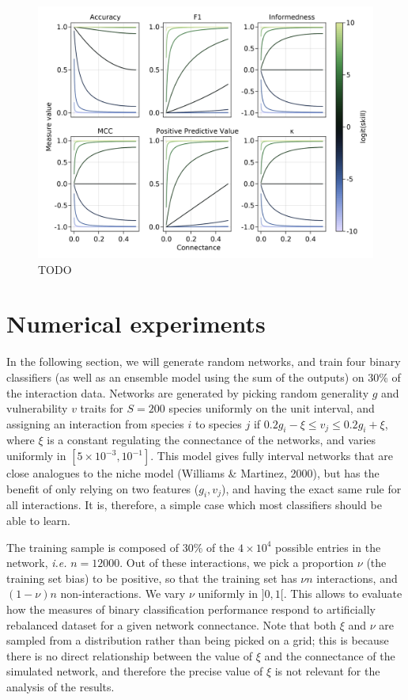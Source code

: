 \documentclass[11pt]{article}
\makeatletter
\def\maxwidth{\ifdim\Gin@nat@width>\linewidth\linewidth
\else\Gin@nat@width\fi}
\let\Oldincludegraphics\includegraphics
\renewcommand{\includegraphics}[1]{\Oldincludegraphics[width=\maxwidth]{#1}}
\makeatother
\begin{document}
\begin{figure}
\hypertarget{fig:connectance}{%
\centering
\includegraphics{figures/changing-connectance.png}
\caption{TODO}\label{fig:connectance}
}
\end{figure}

\hypertarget{numerical-experiments}{%
\section{Numerical experiments}\label{numerical-experiments}}

In the following section, we will generate random networks, and train
four binary classifiers (as well as an ensemble model using the sum of
the outputs) on 30\% of the interaction data. Networks are generated by
picking random generality \(g\) and vulnerability \(v\) traits for
\(S = 200\) species uniformly on the unit interval, and assigning an
interaction from species \(i\) to species \(j\) if
\(0.2g_i-\xi \le v_j \le 0.2g_i+\xi\), where \(\xi\) is a constant
regulating the connectance of the networks, and varies uniformly in
\([5\times 10^{-3}, 10^{-1}]\). This model gives fully interval networks
that are close analogues to the niche model (Williams \& Martinez,
2000), but has the benefit of only relying on two features
(\(g_i, v_j\)), and having the exact same rule for all interactions. It
is, therefore, a simple case which most classifiers should be able to
learn.

The training sample is composed of 30\% of the \(4\times 10^4\) possible
entries in the network, \emph{i.e.} \(n=12000\). Out of these
interactions, we pick a proportion \(\nu\) (the training set bias) to be
positive, so that the training set has \(\nu n\) interactions, and
\((1-\nu) n\) non-interactions. We vary \(\nu\) uniformly in \(]0,1[\).
This allows to evaluate how the measures of binary classification
performance respond to artificially rebalanced dataset for a given
network connectance. Note that both \(\xi\) and \(\nu\) are sampled from
a distribution rather than being picked on a grid; this is because there
is no direct relationship between the value of \(\xi\) and the
connectance of the simulated network, and therefore the precise value of
\(\xi\) is not relevant for the analysis of the results.
\end{document}
